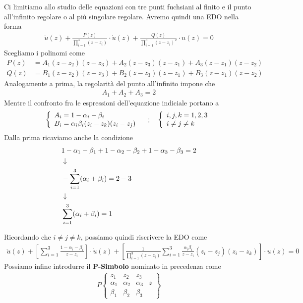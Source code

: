 \newpage
{}
Ci limitiamo allo studio delle equazioni con tre punti fuchsiani al finito e il punto all'infinito regolare o al più singolare regolare. Avremo quindi una EDO nella forma
\begin{align}
	\ddot{u}(z) + \frac{P(z)}{\prod_{i=1}^3(z-z_i)}\cdot \dot{u}(z) + \frac{Q(z)}{\prod_{i=1}^3(z-z_i)^2} \cdot u(z)=0 
\end{align}
Scegliamo i polinomi come
\begin{align}
	P(z)&= A_1(z-z_2)(z-z_3) + A_2(z-z_3)(z-z_1) + A_3(z-z_1)(z-z_2)\\
	Q(z)&= B_1(z-z_2)(z-z_3) + B_2(z-z_3)(z-z_1) + B_3(z-z_1)(z-z_2)
\end{align}
Analogamente a prima, la regolarità del punto all'infinito impone che
\begin{align}
	A_1 + A_2 + A_3 = 2 
\end{align}
Mentre il confronto fra le espressioni dell'equazione indiciale portano a
\begin{align}
	\double{A_i = 1-\alpha_i - \beta_i\hfill}{B_i = \alpha_i\beta_i (z_i - z_k)(z_i - z_j)} \spacer \double{i,j,k = 1,2,3}{i\neq j \neq k\hfill}
\end{align}
Dalla prima ricaviamo anche la condizione
\begin{align}
	&1-\alpha_1 - \beta_1 + 1-\alpha_2 - \beta_2 + 1-\alpha_3 - \beta_3 = 2\\ &\downarrow \nonumber \\
	&-\sum_{i=1}^{3}(\alpha_i + \beta_i) = 2-3\nonumber \\ &\downarrow \nonumber \\
	&\sum_{i=1}^{3}(\alpha_i + \beta_i) = 1
\end{align}

Ricordando che $i\neq j \neq k$, possiamo quindi riscrivere la EDO come
\begin{align}
	\ddot{u}(z) + \left[\sum_{i=1}^3\frac{1-\alpha_i - \beta_i}{z-z_i}\right]\cdot \dot{u}(z) + \left[\frac{1}{\prod_{i=1}^3(z-z_i)}\sum_{i=1}^3\frac{\alpha_i\beta_i}{z-z_i}(z_i-z_j)(z_i-z_k)\right] \cdot u(z)=0
\end{align}
Possiamo infine introdurre il \textbf{P-Simbolo} nominato in precedenza come
\begin{align}
	P\left\{\begin{matrix}
		z_1 & z_2 & z_3 & \\
		\alpha_1 & \alpha_2 & \alpha_3& z\\
		\beta_1 & \beta_2 & \beta_3 & 
	\end{matrix}\right\}
\end{align}


